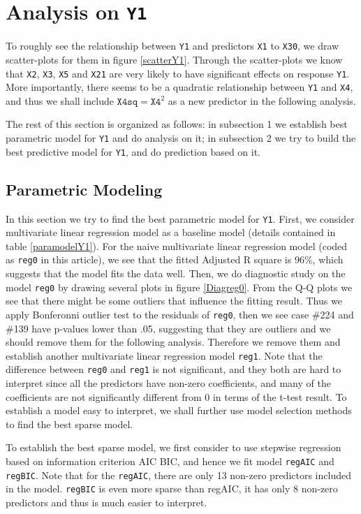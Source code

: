 \documentclass[11pt,oneside,a4paper]{article}
\newcommand{\m}[1]{\texttt{{#1}}}
\begin{document}
\section{Analysis on \m{Y1}}
To roughly see the relationship between \m{Y1} and predictors \m{X1} to \m{X30}, we draw scatter-plots for them in figure \ref{scatterY1}. Through the scatter-plots we know that \m{X2}, \m{X3}, \m{X5} and \m{X21} are very likely to have significant effects on response \m{Y1}. More importantly, there seems to be a quadratic relationship between \m{Y1} and \m{X4}, and thus we shall include $\m{X4sq} = \m{X4}^{2}$ as a new predictor in the following analysis.

The rest of this section is organized as follows: in subsection 1 we establish best parametric model for \m{Y1} and do analysis on it; in subsection 2 we try to build the best predictive model for \m{Y1}, and do prediction based on it.

\subsection{Parametric Modeling}
In this section we try to find the best parametric model for \m{Y1}. First, we consider multivariate linear regression model as a baseline model (details contained in table \ref{paramodelY1}). For the naive multivariate linear regression model (coded as \m{reg0} in this article), we see that the fitted Adjusted R square is 96\%, which suggests that the model fits the data well. Then, we do diagnostic study on the model \m{reg0} by drawing several plots in figure \ref{Diagreg0}. From the Q-Q plots we see that there might be some outliers that influence the fitting result. Thus we apply Bonferonni outlier test to the residuals of \m{reg0}, then we see case \#224 and \#139 have p-values lower than .05, suggesting that they are outliers and we should remove them for the following analysis. Therefore we remove them and establish another multivariate linear regression model \m{reg1}. Note that the difference between \m{reg0} and \m{reg1} is not significant, and they both are hard to interpret since all the predictors have non-zero coefficients, and many of the coefficients are not significantly different from 0 in terms of the t-test result. To establish a model easy to interpret, we shall further use model selection methods to find the best sparse model.

To establish the best sparse model, we first consider to use stepwise regression based on information criterion AIC BIC, and hence we fit model \m{regAIC} and \m{regBIC}. Note that for the \m{regAIC}, there are only 13 non-zero predictors included in the model. \m{regBIC} is even more sparse than regAIC, it has only 8 non-zero predictors and thus is much easier to interpret. 
\end{document}
